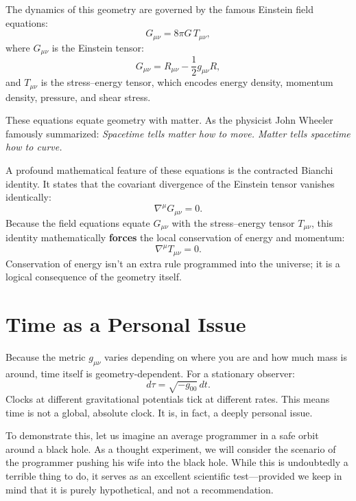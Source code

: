 The dynamics of this geometry are governed by the famous Einstein field equations:
\begin{equation}
G_{\mu\nu} = 8\pi G \, T_{\mu\nu},
\end{equation}
where $G_{\mu\nu}$ is the Einstein tensor:
\begin{equation}
G_{\mu\nu} = R_{\mu\nu} - \frac{1}{2} g_{\mu\nu} R,
\end{equation}
and $T_{\mu\nu}$ is the stress–energy tensor, which encodes energy density, momentum density, pressure, and shear stress.

These equations equate geometry with matter.
As the physicist John Wheeler famously summarized: \emph{Spacetime tells matter how to move. Matter tells spacetime how to curve.}

A profound mathematical feature of these equations is the contracted Bianchi identity.
It states that the covariant divergence of the Einstein tensor vanishes identically:
\begin{equation}
\nabla^\mu G_{\mu\nu} = 0.
\end{equation}
Because the field equations equate $G_{\mu\nu}$ with the stress–energy tensor $T_{\mu\nu}$, this identity mathematically \textbf{forces} the local conservation of energy and momentum:
\begin{equation}
\nabla^\mu T_{\mu\nu} = 0.
\end{equation}
Conservation of energy isn't an extra rule programmed into the universe; it is a logical consequence of the geometry itself.

\section{Time as a Personal Issue}

Because the metric $g_{\mu\nu}$ varies depending on where you are and how much mass is around, time itself is geometry-dependent.
For a stationary observer:
\begin{equation}
d\tau = \sqrt{-g_{00}} \, dt.
\end{equation}
Clocks at different gravitational potentials tick at different rates.
This means time is not a global, absolute clock.
It is, in fact, a deeply personal issue.

To demonstrate this, let us imagine an average programmer in a safe orbit around a black hole.
As a thought experiment, we will consider the scenario of the programmer pushing his wife into the black hole.
While this is undoubtedly a terrible thing to do, it serves as an excellent scientific test---provided we keep in mind that it is purely hypothetical, and not a recommendation.

